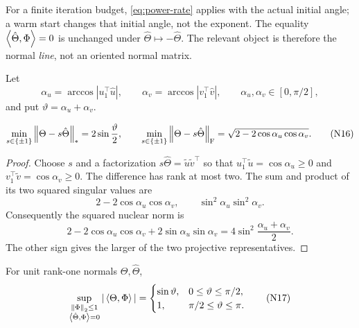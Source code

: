 For a finite iteration budget, \eqref{eq:power-rate} applies with the actual
initial angle; a warm start changes that initial angle, not the exponent.
The equality \(\left\langle \hat\Theta,\Phi\right\rangle=0\) is unchanged under
\(\hat\Theta\mapsto-\hat\Theta\).  The relevant object is therefore the normal
\emph{line}, not an oriented normal matrix.

Let
\begin{equation}
 \alpha_u=\arccos|u_1^\top\hat u|,
 \qquad
 \alpha_v=\arccos|v_1^\top\hat v|,
 \qquad
 \alpha_u,\alpha_v\in[0,\pi/2],
\tag{N15}
\label{eq:acute-angles}
\end{equation}
and put \(\vartheta=\alpha_u+\alpha_v\).

\begin{lemma}
\label{lem:projective-normal-distance}
\begin{equation}
 \min_{s\in\{\pm1\}}\left\lVert \Theta-s\hat\Theta\right\rVert_{*}
 =
 2\sin\frac{\vartheta}{2},
\qquad
 \min_{s\in\{\pm1\}}\left\lVert \Theta-s\hat\Theta\right\rVert_{\mathrm F}
 =
 \sqrt{2-2\cos\alpha_u\cos\alpha_v}.
\tag{N16}
\label{eq:projective-distance}
\end{equation}
\end{lemma}

\begin{proof}
Choose \(s\) and a factorization
\(s\hat\Theta=\tilde u\tilde v^\top\) so that
\(u_1^\top\tilde u=\cos\alpha_u\ge0\) and
\(v_1^\top\tilde v=\cos\alpha_v\ge0\).  The difference has rank at most two.
The sum and product of its two squared singular values are
\[
 2-2\cos\alpha_u\cos\alpha_v,
 \qquad
 \sin^2\alpha_u\sin^2\alpha_v.
\]
Consequently the squared nuclear norm is
\[
 2-2\cos\alpha_u\cos\alpha_v
 +2\sin\alpha_u\sin\alpha_v
 =4\sin^2\frac{\alpha_u+\alpha_v}{2}.
\]
The other sign gives the larger of the two projective representatives.
\end{proof}

\begin{theorem}
\label{thm:sharp-normal-leakage}
For unit rank-one normals \(\Theta,\hat\Theta\),
\begin{equation}
 \sup_{\substack{\left\lVert \Phi\right\rVert_{2}\le1\\
                  \left\langle \hat\Theta,\Phi\right\rangle=0}}
 |\left\langle \Theta,\Phi\right\rangle|
 =
 \begin{cases}
 \sin\vartheta,&0\le\vartheta\le\pi/2,\\
 1,&\pi/2\le\vartheta\le\pi.
 \end{cases}
\tag{N17}
\label{eq:sharp-normal-leakage}
\end{equation}
\end{theorem}

